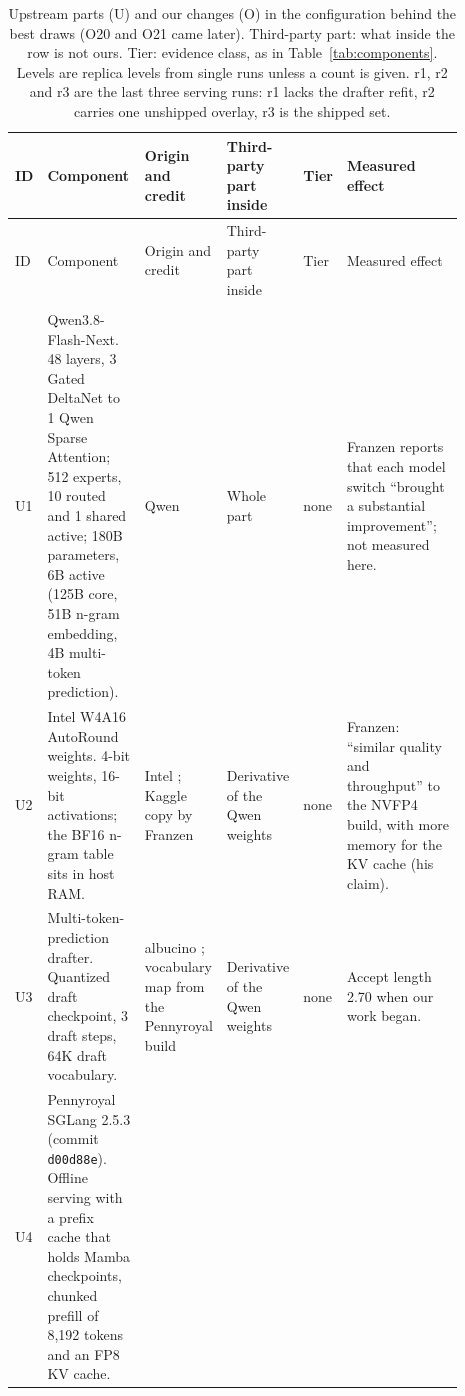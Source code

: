 \begingroup\footnotesize
\setlength{\tabcolsep}{3pt}
\renewcommand{\arraystretch}{1.1}
\begin{longtable}{@{}>{\raggedright\arraybackslash}p{0.035\linewidth}>{\raggedright\arraybackslash}p{0.22\linewidth}>{\raggedright\arraybackslash}p{0.16\linewidth}>{\raggedright\arraybackslash}p{0.14\linewidth}>{\raggedright\arraybackslash}p{0.05\linewidth}>{\raggedright\arraybackslash}p{0.28\linewidth}@{}}
\caption{Upstream parts (U) and our changes (O) in the configuration behind the best draws (O20 and O21 came later). Third-party part: what inside the row is not ours. Tier: evidence class, as in Table~\ref{tab:components}. Levels are replica levels from single runs unless a count is given. r1, r2 and r3 are the last three serving runs: r1 lacks the drafter refit, r2 carries one unshipped overlay, r3 is the shipped set.}\label{tab:fullcomponents}\\
\toprule
ID & Component & Origin and credit & Third-party part inside & Tier & Measured effect \\
\midrule
\endfirsthead
\toprule
ID & Component & Origin and credit & Third-party part inside & Tier & Measured effect \\
\midrule
\endhead
\bottomrule
\endfoot
\multicolumn{6}{@{}l}{\textbf{Upstream parts, taken as given}} \\
\addlinespace
U1 & Qwen3.8-Flash-Next. 48 layers, 3 Gated DeltaNet to 1 Qwen Sparse Attention; 512 experts, 10 routed and 1 shared active; 180B parameters, 6B active (125B core, 51B n-gram embedding, 4B multi-token prediction). %
& Qwen \citep{qwen38flashnext,qiu2026qwen38next,yang2024gateddeltanet}
& Whole part
& none
& Franzen reports that each model switch ``brought a substantial improvement''; not measured here. \\
\addlinespace
U2 & Intel W4A16 AutoRound weights. 4-bit weights, 16-bit activations; the BF16 n-gram table sits in host RAM.
& Intel \citep{intel2026w4a16}; Kaggle copy by Franzen
& Derivative of the Qwen weights
& none
& Franzen: ``similar quality and throughput'' to the NVFP4 build, with more memory for the KV cache (his claim). \\
\addlinespace
U3 & Multi-token-prediction drafter. Quantized draft checkpoint, 3 draft steps, 64K draft vocabulary. %
& albucino \citep{albucino2026drafter}; vocabulary map from the Pennyroyal build
& Derivative of the Qwen weights
& none
& Accept length 2.70 when our work began. \\ %
\addlinespace
U4 & Pennyroyal SGLang 2.5.3 (commit \texttt{d00d88e}). Offline serving with a prefix cache that holds Mamba checkpoints, chunked prefill of 8,192 tokens and an FP8 KV cache. %

\end{longtable}
